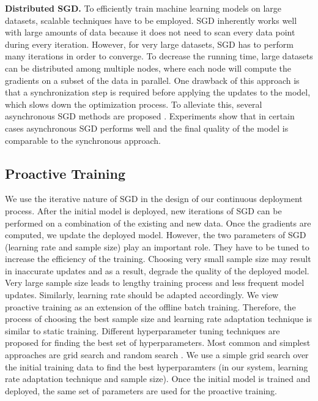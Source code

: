 \textbf{Distributed SGD.}
To efficiently train machine learning models on large datasets, scalable techniques have to be employed.
SGD inherently works well with large amounts of data because it does not need to scan every data point during every iteration.
However, for very large datasets, SGD has to perform many iterations in order to converge.
To decrease the running time, large datasets can be distributed among multiple nodes, where each node will compute the gradients on a subset of the data in parallel.
One drawback of this approach is that a synchronization step is required before applying the updates to the model, which slows down the optimization process.
To alleviate this, several asynchronous SGD methods are proposed \cite{recht2011hogwild, dean2012large}. 
Experiments show that in certain cases asynchronous SGD performs well and the final quality of the model is comparable to the synchronous approach.

\subsection{Proactive Training}
We use the iterative nature of SGD in the design of our continuous deployment process.
After the initial model is deployed, new iterations of SGD can be performed on a combination of the existing and new data.
Once the gradients are computed, we update the deployed model.
However, the two parameters of SGD (learning rate and sample size) play an important role.
They have to be tuned to increase the efficiency of the training.
Choosing very small sample size may result in inaccurate updates and as a result, degrade the quality of the deployed model.
Very large sample size leads to lengthy training process and less frequent model updates.
Similarly, learning rate should be adapted accordingly.
We view proactive training as an extension of the offline batch training.
Therefore, the process of choosing the best sample size and learning rate adaptation technique is similar to static training.
Different hyperparameter tuning techniques are proposed for finding the best set of hyperparameters.
Most common and simplest approaches are grid search and random search \cite{bergstra2012random}.
We use a simple grid search over the initial training data to find the best hyperparamters (in our system, learning rate adaptation technique and sample size).
Once the initial model is trained and deployed, the same set of parameters are used for the proactive training.


